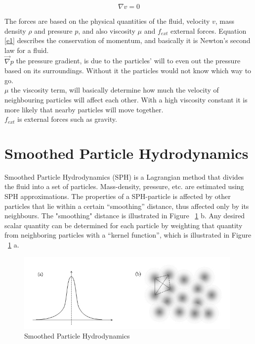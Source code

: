 \documentclass[a4paper,12pt,twoside,final]{report}
\begin{document}
\begin{equation}
{\nabla v} = {0}
\label{e0}
\end{equation}

\noindent The forces are based on the physical quantities of the fluid, velocity $v$, mass density $\rho$ and pressure $p$, and also viscosity $\mu$ and $f_{ext}$ external forces. Equation \ref{e1} describes the conservation of momentum, and basically it is Newton’s second law for a fluid.\\

\noindent  $\overrightarrow \nabla p$ the pressure gradient, is due to the particles’ will to even out the pressure based on its surroundings. Without it the particles would not know which way to go. \\

\noindent $\mu$ the viscosity term, will basically determine how much the velocity of neighbouring particles will affect each other. With a high viscosity constant it is more likely that nearby particles will move together. \\

\noindent $f_{ext}$ is external forces such as gravity.


\section{Smoothed Particle Hydrodynamics}
Smoothed Particle Hydrodynamics (SPH) is a Lagrangian method that divides the fluid into a set of particles. Mass-density, pressure, etc. are estimated using SPH approximations. The properties of a SPH-particle is affected by other particles that lie within a certain “smoothing” distance, thus affected only by its neighbours. The "smoothing" distance is illustrated in Figure ~\ref{fig:sph} b. Any desired scalar quantity can be determined for each particle by weighting that quantity from neighboring particles with a “kernel function”, which is illustrated in Figure ~\ref{fig:sph} a. \\

\begin{figure}[h]
\begin{center}
    \includegraphics[width=11cm]{figs/sph.jpg} 
\end{center}
\caption{Smoothed Particle Hydrodynamics}
\label{fig:sph}
\end{figure}
\end{document}
